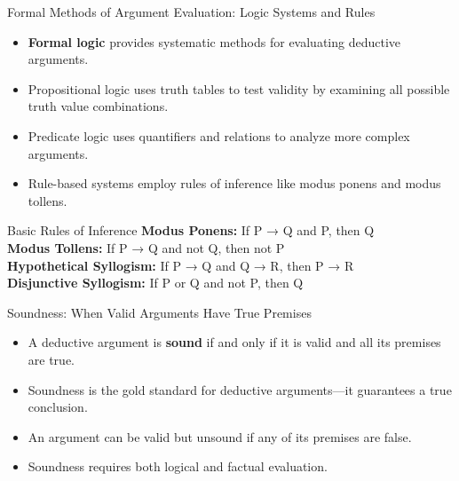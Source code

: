 \documentclass{beamer}
\begin{document}
\begin{frame}{Formal Methods of Argument Evaluation: Logic Systems and Rules}
    \begin{itemize}
        \item \textbf{Formal logic} provides systematic methods for evaluating deductive arguments.
        \item Propositional logic uses truth tables to test validity by examining all possible truth value combinations.
        \item Predicate logic uses quantifiers and relations to analyze more complex arguments.
        \item Rule-based systems employ rules of inference like modus ponens and modus tollens.
    \end{itemize}
    
    \begin{block}{Basic Rules of Inference}
        \textbf{Modus Ponens:} If P → Q and P, then Q\\
        \textbf{Modus Tollens:} If P → Q and not Q, then not P\\
        \textbf{Hypothetical Syllogism:} If P → Q and Q → R, then P → R\\
        \textbf{Disjunctive Syllogism:} If P or Q and not P, then Q
    \end{block}
\end{frame}

\begin{frame}{Soundness: When Valid Arguments Have True Premises}
	\begin{itemize}
		\item A deductive argument is \textbf{sound} if and only if it is valid and all its premises are true.
		\item Soundness is the gold standard for deductive arguments—it guarantees a true conclusion.
		\item An argument can be valid but unsound if any of its premises are false.
		\item Soundness requires both logical and factual evaluation.
	\end{itemize}
	
\end{frame}
\end{document}
